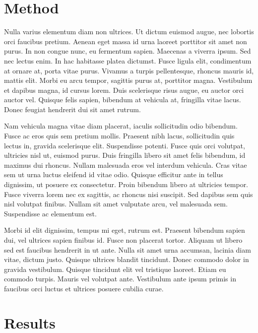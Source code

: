 \begin{refsection}
\section{Method}

Nulla varius elementum diam non ultrices. Ut dictum euismod augue, nec lobortis orci faucibus pretium. Aenean eget massa id urna laoreet porttitor sit amet non purus. In non congue nunc, eu fermentum sapien. Maecenas a viverra ipsum. Sed nec lectus enim. In hac habitasse platea dictumst. Fusce ligula elit, condimentum at ornare at, porta vitae purus. Vivamus a turpis pellentesque, rhoncus mauris id, mattis elit. Morbi eu arcu tempor, sagittis purus at, porttitor magna. Vestibulum et dapibus magna, id cursus lorem. Duis scelerisque risus augue, eu auctor orci auctor vel. Quisque felis sapien, bibendum at vehicula at, fringilla vitae lacus. Donec feugiat hendrerit dui sit amet rutrum.

Nam vehicula magna vitae diam placerat, iaculis sollicitudin odio bibendum. Fusce ac eros quis sem pretium mollis. Praesent nibh lacus, sollicitudin quis lectus in, gravida scelerisque elit. Suspendisse potenti. Fusce quis orci volutpat, ultricies nisl ut, euismod purus. Duis fringilla libero sit amet felis bibendum, id maximus dui rhoncus. Nullam malesuada eros vel interdum vehicula. Cras vitae sem ut urna luctus eleifend id vitae odio. Quisque efficitur ante in tellus dignissim, ut posuere ex consectetur. Proin bibendum libero at ultricies tempor. Fusce viverra lorem nec ex sagittis, ac rhoncus nisi suscipit. Sed dapibus sem quis nisl volutpat finibus. Nullam sit amet vulputate arcu, vel malesuada sem. Suspendisse ac elementum est.

Morbi id elit dignissim, tempus mi eget, rutrum est. Praesent bibendum sapien dui, vel ultrices sapien finibus id. Fusce non placerat tortor. Aliquam ut libero sed est faucibus hendrerit in ut ante. Nulla sit amet urna accumsan, lacinia diam vitae, dictum justo. Quisque ultrices blandit tincidunt. Donec commodo dolor in gravida vestibulum. Quisque tincidunt elit vel tristique laoreet. Etiam eu commodo turpis. Mauris vel volutpat ante. Vestibulum ante ipsum primis in faucibus orci luctus et ultrices posuere cubilia curae.

\section{Results}


\end{refsection}
